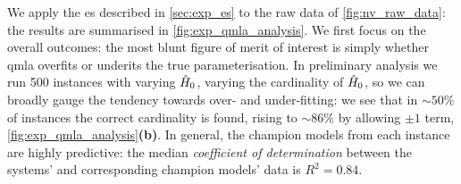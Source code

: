 We apply the \gls{es} described in \cref{sec:exp_es} to the raw data of \cref{fig:nv_raw_data}:
    the results are summarised in \cref{fig:exp_qmla_analysis}.
We first focus on the overall outcomes:
    the most blunt figure of merit of interest is simply whether \gls{qmla}
    overfits or underits the true parameterisation. 
In preliminary analysis we run 500 \glspl{instance} with varying $\hat{H}_0$, 
    varying the cardinality of $\hat{H}_0$,
    so we can broadly gauge the tendency towards over- and under-fitting:
    we see that in $\sim50\%$ of \glspl{instance} the correct cardinality is found,  
    rising to $\sim86\%$ by allowing $\pm1$ term, \cref{fig:exp_qmla_analysis}\textbf{(b)}. 
In general, the \glspl{champion model} from each instance are highly predictive: 
    the median \emph{coefficient of determination} between the systems' and corresponding \glspl{champion model}' data is 
    $R^2 = 0.84$. 
\par 



